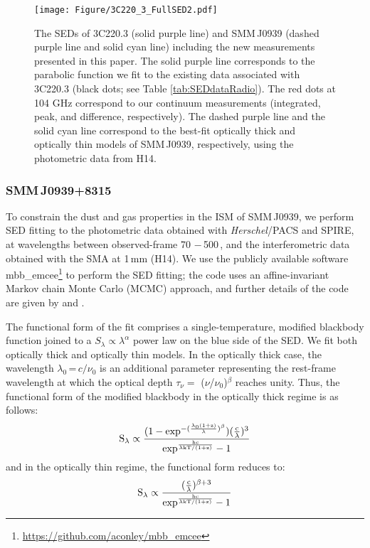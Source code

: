 \documentclass[twocolumn,apj,numberedappendix]{emulateapj}
\begin{document}
\begin{figure}[!tbph]
\centering
\texttt{[image: Figure/3C220\_3\_FullSED2.pdf]}
\caption{The SEDs of 3C220.3 (solid purple line) and SMM\,J0939 (dashed purple line and solid cyan line) including the new measurements presented in this paper.
The solid purple line corresponds to the parabolic function we
fit to the existing data associated with 3C220.3 (black dots; see Table \ref{tab:SEDdataRadio}).
The red dots at 104 GHz correspond to
our continuum measurements (integrated, peak, and difference, respectively).
The dashed purple line and
the solid cyan line correspond to the best-fit optically thick and optically thin models of SMM\,J0939, respectively, using the photometric data from H14. \label{fig:SED}}
\end{figure}

\subsubsection{SMM\,J0939+8315} \label{sec:SEDBg}
To constrain the dust and gas properties in the ISM of SMM\,J0939, we perform SED fitting to the
photometric data obtained with {\it Herschel}/PACS and SPIRE, at wavelengths
between observed-frame 70\,\micron\,$-$\,500\,\micron, and the interferometric data obtained with the SMA at 1\,mm (H14). We use the publicly
available software {\sc mbb\_emcee}\footnote{\url{https://github.com/aconley/mbb\_emcee}} to perform the SED fitting; the code uses an affine-invariant Markov chain Monte
Carlo (MCMC) approach, and further details of the code are given by \citet{Riechers13a} and \citet{Dowell14a}. \par
The
functional form of the fit comprises a single-temperature, modified blackbody function joined to a $S_{\lambda} \propto \lambda^\alpha
$ power law on the blue
side of the SED.
We fit both optically thick and optically thin models. In the optically thick case, the wavelength $
\lambda_0$\,=\,${c}/{\nu_0}$ is an additional parameter representing the rest-frame wavelength at which the optical
depth $\tau_{\nu} =$ ($\nu$/$\nu_0$)$^\beta$ reaches unity. Thus, the functional form of the modified blackbody
in the optically thick regime is as follows:
\begin{equation}
\rm S_{\lambda} \propto \frac{(1-exp^{-(\frac{\lambda_0 (1+z)}{\lambda})^{\beta}})(\frac{c}{\lambda})^3}
{exp^{\frac{hc}{\lambda\rm{kT/(1+z)} } }-1}
\end{equation}
and in the optically thin regime, the functional form reduces to:
\begin{equation}
\rm S_{\lambda} \propto \frac{(\frac{c}{\lambda})^{\beta+3}}{exp^{\frac{hc}{\lambda\rm{kT/(1+z)}}}-1}
\end{equation}
\end{document}
